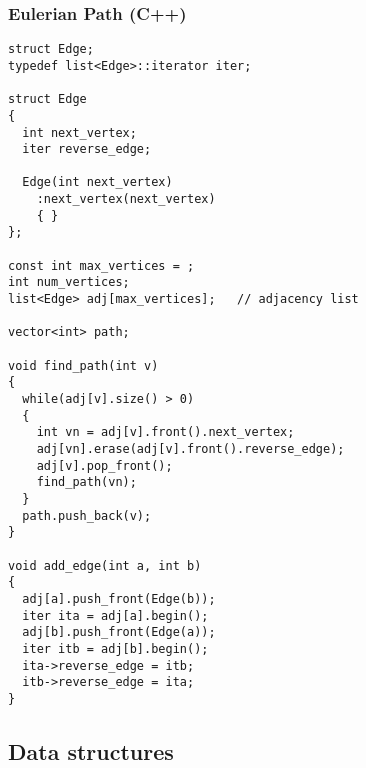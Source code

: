 \subsubsection{Eulerian Path (C++)}
\begin{lstlisting}
struct Edge;
typedef list<Edge>::iterator iter;

struct Edge
{
  int next_vertex;
  iter reverse_edge;

  Edge(int next_vertex)
    :next_vertex(next_vertex)
    { }
};

const int max_vertices = ;
int num_vertices;
list<Edge> adj[max_vertices];   // adjacency list

vector<int> path;

void find_path(int v)
{
  while(adj[v].size() > 0)
  {
    int vn = adj[v].front().next_vertex;
    adj[vn].erase(adj[v].front().reverse_edge);
    adj[v].pop_front();
    find_path(vn);
  }
  path.push_back(v);
}

void add_edge(int a, int b)
{
  adj[a].push_front(Edge(b));
  iter ita = adj[a].begin();
  adj[b].push_front(Edge(a));
  iter itb = adj[b].begin();
  ita->reverse_edge = itb;
  itb->reverse_edge = ita;
}

\end{lstlisting}
\subsection{Data structures}
